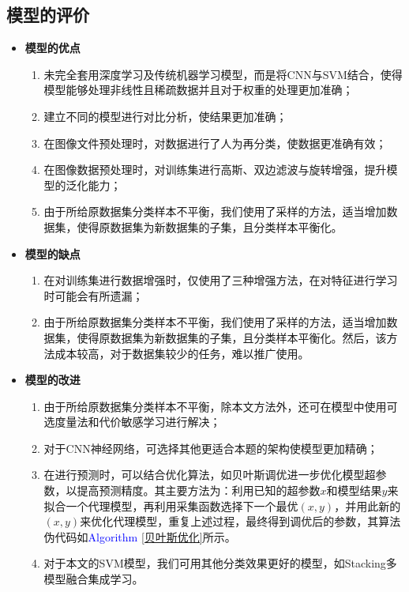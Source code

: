 \documentclass{MathorCupmodeling}
\begin{document}
	\subsection{模型的评价}
	\begin{itemize}
		\item \textbf{模型的优点}
		\begin{enumerate}
			\item 未完全套用深度学习及传统机器学习模型，而是将CNN与SVM结合，使得模型能够处理非线性且稀疏数据并且对于权重的处理更加准确；
			\item 建立不同的模型进行对比分析，使结果更加准确；
			\item 在图像文件预处理时，对数据进行了人为再分类，使数据更准确有效；
			\item 在图像数据预处理时，对训练集进行高斯、双边滤波与旋转增强，提升模型的泛化能力；
			\item 由于所给原数据集分类样本不平衡，我们使用了采样的方法，适当增加数据集，使得原数据集为新数据集的子集，且分类样本平衡化。
		\end{enumerate}
		\item \textbf{模型的缺点}
		\begin{enumerate}
			\item 在对训练集进行数据增强时，仅使用了三种增强方法，在对特征进行学习时可能会有所遗漏；
			\item 由于所给原数据集分类样本不平衡，我们使用了采样的方法，适当增加数据集，使得原数据集为新数据集的子集，且分类样本平衡化。然后，该方法成本较高，对于数据集较少的任务，难以推广使用。
		\end{enumerate}
		\item \textbf{模型的改进}
		\begin{enumerate}
			\item 由于所给原数据集分类样本不平衡，除本文方法外，还可在模型中使用可选度量法和代价敏感学习进行解决\textcolor{blue}{\cite{数据挖掘导论}}；
			\item 对于CNN神经网络，可选择其他更适合本题的架构使模型更加精确；
			\item 在进行预测时，可以结合优化算法，如贝叶斯调优进一步优化模型超参数，以提高预测精度。其主要方法为：利用已知的超参数$x$和模型结果$y$来拟合一个代理模型，再利用采集函数选择下一个最优$\left(x,y\right)$，并用此新的$\left(x,y\right)$来优化代理模型，重复上述过程，最终得到调优后的参数，其算法伪代码如\textcolor{blue}{Algorithm \ref{贝叶斯优化}}所示。
			\item 对于本文的SVM模型，我们可用其他分类效果更好的模型，如Stacking多模型融合集成学习。
		\end{enumerate}
	\end{itemize}
\end{document}
